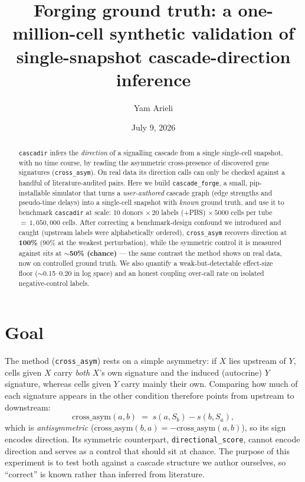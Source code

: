 \documentclass[11pt,a4paper]{article}
\title{\textbf{Forging ground truth: a one-million-cell synthetic validation
of single-snapshot cascade-direction inference}}
\author{Yam Arieli}
\date{July 9, 2026}
\begin{document}
\maketitle

\begin{abstract}
\noindent
\texttt{cascadir} infers the \emph{direction} of a signalling cascade from a single
single-cell snapshot, with no time course, by reading the asymmetric cross-presence of
discovered gene signatures (\texttt{cross\_asym}). On real data its direction calls can
only be checked against a handful of literature-audited pairs. Here we build
\texttt{cascade\_forge}, a small, pip-installable simulator that turns a
\emph{user-authored} cascade graph (edge strengths and pseudo-time delays) into a
single-cell snapshot with \emph{known} ground truth, and use it to benchmark
\texttt{cascadir} at scale: $10$ donors $\times\,20$ labels ($+$PBS) $\times\,5000$
cells per tube $=\,1{,}050{,}000$ cells. After correcting a benchmark-design confound we
introduced and caught (upstream labels were alphabetically ordered), \texttt{cross\_asym}
recovers direction at \textbf{100\%} ($90\%$ at the weakest perturbation), while the
symmetric control it is measured against sits at \textbf{$\sim$50\% (chance)} --- the same
contrast the method shows on real data, now on controlled ground truth. We also quantify
a weak-but-detectable effect-size floor ($\sim$0.15--0.20 in log space) and an honest
coupling over-call rate on isolated negative-control labels.
\end{abstract}

\section{Goal}
The method (\texttt{cross\_asym}) rests on a simple asymmetry: if $X$ lies upstream of
$Y$, cells given $X$ carry \emph{both} $X$'s own signature and the induced (autocrine)
$Y$ signature, whereas cells given $Y$ carry mainly their own. Comparing how much of each
signature appears in the other condition therefore points from upstream to downstream:
\[
  \mathrm{cross\_asym}(a,b) \;=\; s(a,S_b) - s(b,S_a),
\]
which is \emph{antisymmetric} ($\mathrm{cross\_asym}(b,a)=-\mathrm{cross\_asym}(a,b)$), so
its sign encodes direction. Its symmetric counterpart, \texttt{directional\_score}, cannot
encode direction and serves as a control that should sit at chance. The purpose of this
experiment is to test both against a cascade structure we author ourselves, so ``correct''
is known rather than inferred from literature.
\end{document}
